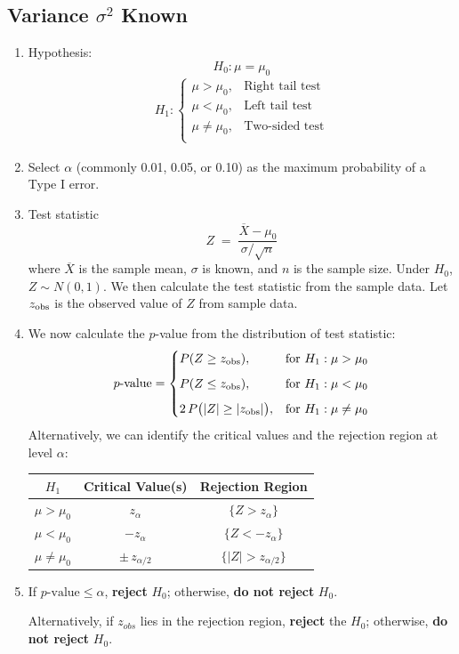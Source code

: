 \documentclass[twoside]{book}
\begin{document}
\subsection{Variance $\sigma^2$ Known}

\begin{enumerate}
	\item Hypothesis:
	$$H_0: \mu = \mu_0$$
	\begin{align*}
	H_1: \begin{cases}
	\mu > \mu_0, & \text{Right tail test}\\[6pt]
	\mu < \mu_0, & \text{Left tail test}\\[6pt]
	\mu \neq \mu_0, & \text{Two-sided test}\\[6pt]
	\end{cases}
	\end{align*}

	\item Select \(\alpha\) (commonly 0.01, 0.05, or 0.10) as the maximum probability of a Type I error.

	\item Test statistic
	\[
	Z \;=\;\frac{\overline{X} - \mu_0}{\sigma / \sqrt{n}}
	\]
	where \(\overline{X}\) is the sample mean, \(\sigma\) is known, and \(n\) is the sample size.  Under \(H_0\), \(Z \sim N(0,1)\). We then calculate the test statistic from the sample data. Let \(z_{\rm obs}\) is the observed value of \(Z\) from sample data.

	\item We now calculate the \(p\)-value from the distribution of test statistic:
		\[
		p\text{-value} =
		\begin{cases}
		P(Z \ge z_{\rm obs}), & \text{for }H_1:\mu>\mu_0\\[6pt]
		P(Z \le z_{\rm obs}), & \text{for }H_1:\mu<\mu_0\\[6pt]
		2\,P\bigl(|Z| \ge |z_{\rm obs}|\bigr), & \text{for }H_1:\mu\neq\mu_0
		\end{cases}
		\]
	Alternatively, we can identify the critical values and the rejection region at level $\alpha$:
	\begin{table}[H]
		\centering
		\begin{tabular}{@{}c|c|c@{}}
			\toprule
			\textbf{$H_1$} & \textbf{Critical Value(s)} & \textbf{Rejection Region} \\
			\midrule
			$\mu > \mu_0$ & $ z_{\alpha} $ &
			\(\{Z>z_{\alpha}\}\) \\[6pt]
			$\mu < \mu_0$ &
			$ -z_{\alpha} $ &
			\(\{Z<-z_{\alpha}\}\) \\[6pt]
			$\mu \neq \mu_0$ &
			$ \pm\,z_{\alpha/2} $&
			$\{|Z| > z_{\alpha/2}\}$ \\
			\bottomrule
		\end{tabular}
	\end{table}

	\item If \(p\text{-value} \le \alpha\), \textbf{reject} \(H_0\); otherwise, \textbf{do not reject} \(H_0\).

	Alternatively, if $z_{obs}$ lies in the rejection region, \textbf{reject} the \(H_0\); otherwise, \textbf{do not reject} \(H_0\).
\end{enumerate}
\end{document}
